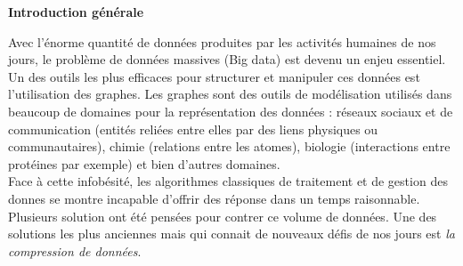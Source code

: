 \documentclass[a4paper,oneside,12pt]{report}
\theoremstyle{definition}
\begin{document}






\pagestyle{plain}
\tableofcontents
\newpage



\listoffigures
{}
\cleardoublepage


\listoftables
{}



\printglossaries



\cleardoublepage



	\thispagestyle{plain}
		\Huge{ 
			\textbf {Introduction générale}} \\[0.5in]
			\normalsize
			Avec l'énorme quantité de données produites par les activités humaines de nos jours, le problème de données massives (Big data) est devenu un enjeu essentiel. Un des outils les plus efficaces pour structurer et manipuler ces données est l'utilisation des graphes. Les graphes sont des outils de modélisation utilisés dans beaucoup de domaines pour la représentation des données : réseaux sociaux et de communication (entités reliées entre elles par des liens physiques ou communautaires), chimie (relations entre les atomes), biologie (interactions entre protéines par exemple) et bien d'autres domaines.\\
			
	Face à cette infobésité, les algorithmes classiques de traitement et de gestion des donnes se montre incapable d'offrir des réponse dans un temps raisonnable. Plusieurs solution ont été pensées pour contrer ce volume de données. Une des solutions les plus anciennes mais qui connait de nouveaux défis de nos jours est \textit{la compression de données}.\\
\end{document}

